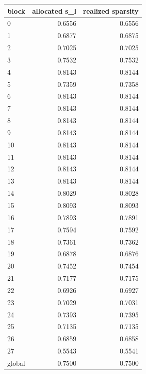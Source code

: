 \begin{tabular}{lrr}
\toprule
block & allocated s\_l & realized sparsity \\
\midrule
0 & 0.6556 & 0.6556 \\
1 & 0.6877 & 0.6875 \\
2 & 0.7025 & 0.7025 \\
3 & 0.7532 & 0.7532 \\
4 & 0.8143 & 0.8144 \\
5 & 0.7359 & 0.7358 \\
6 & 0.8143 & 0.8144 \\
7 & 0.8143 & 0.8144 \\
8 & 0.8143 & 0.8144 \\
9 & 0.8143 & 0.8144 \\
10 & 0.8143 & 0.8144 \\
11 & 0.8143 & 0.8144 \\
12 & 0.8143 & 0.8144 \\
13 & 0.8143 & 0.8144 \\
14 & 0.8029 & 0.8028 \\
15 & 0.8093 & 0.8093 \\
16 & 0.7893 & 0.7891 \\
17 & 0.7594 & 0.7592 \\
18 & 0.7361 & 0.7362 \\
19 & 0.6878 & 0.6876 \\
20 & 0.7452 & 0.7454 \\
21 & 0.7177 & 0.7175 \\
22 & 0.6926 & 0.6927 \\
23 & 0.7029 & 0.7031 \\
24 & 0.7393 & 0.7395 \\
25 & 0.7135 & 0.7135 \\
26 & 0.6859 & 0.6858 \\
27 & 0.5543 & 0.5541 \\
global & 0.7500 & 0.7500 \\
\bottomrule
\end{tabular}
